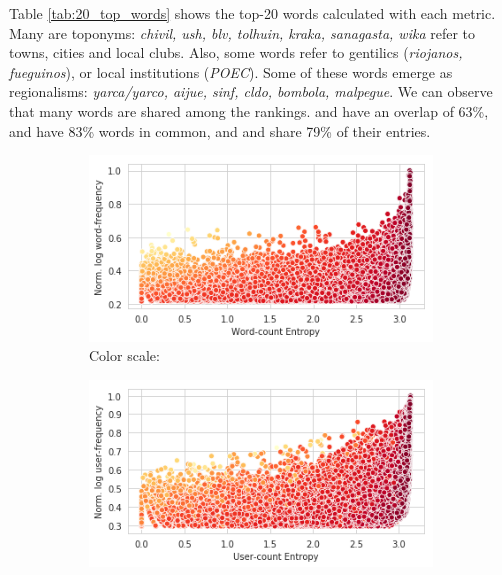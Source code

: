 Table \ref{tab:20_top_words} shows the top-20 words calculated with each metric.  Many are toponyms: \emph{chivil, ush, blv, tolhuin, kraka, sanagasta, wika} refer to towns, cities and local clubs. Also, some words refer to gentilics (\emph{riojanos, fueguinos}), or local institutions (\emph{POEC}). Some of these words emerge as regionalisms: \emph{yarca/yarco, aijue, sinf, cldo, bombola, malpegue}. We can observe that many words are shared among the rankings. \userrank*{} and \wordrank*{} have an overlap of 63\%, \userrank*{} and \mixedrank*{} have 83\% words in common, and \userrank*{} and \wordrank*{} share 79\% of their entries.



\begin{figure}[t!]
   \centering
   \begin{subfigure}[t]{0.49\textwidth}
   \includegraphics[width=\textwidth]{./images/word_iv_word_axes.png}
   \caption{Color scale: \wordrank{}}
   \label{fig:word_iv_word_axes}
   \end{subfigure}
   \begin{subfigure}[t]{0.49\textwidth}
   \includegraphics[width=\textwidth]{./images/word_iv_user_axes.png}

\end{subfigure}
\end{figure}
